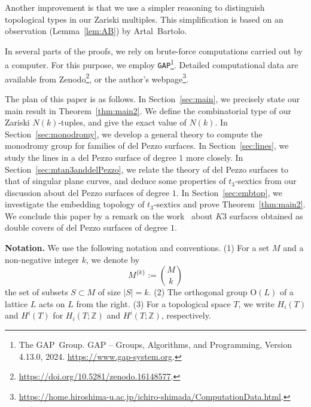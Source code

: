 \documentclass{math}
\theoremstyle{plain}
\numberwithin{equation}{section}
\newcommand{\ZZ}{\mathord{\mathbb Z}}
\newcommand{\OG}{\mathord{\mathrm{O}}}
\newcommand{\spset}[1]{^{\{#1\}}}
\newcommand{\mtan}[1]{t_{#1}}
\begin{document}
Another improvement is that 
we use a simpler reasoning to distinguish topological types in our Zariski multiples.
This simplification is based on an observation (Lemma~\ref{lem:AB})  by Artal~Bartolo.
\par
%
In several parts of the proofs, we rely on brute-force computations carried out by a computer. 
For this purpose, we employ \texttt{GAP}\footnote{The GAP~Group.
{GAP} -- {G}roups, {A}lgorithms, and {P}rogramming, Version  4.13.0, 2024.
\url{https://www.gap-system.org}.}. %
Detailed computational data are available from Zenodo\footnote{\url{https://doi.org/10.5281/zenodo.16148577}.},
or the author's webpage\footnote{\url{https://home.hiroshima-u.ac.jp/ichiro-shimada/ComputationData.html}.}.
%
\par
The plan of this paper is as follows.
In Section~\ref{sec:main}, we precisely state our main result in Theorem~\ref{thm:main2}.
We define the combinatorial type %
of our  Zariski $N(k)$-tuples, 
and give the exact value of $N(k)$.
In Section~\ref{sec:monodromy}, 
we develop a general theory to compute the monodromy group
for families of del Pezzo surfaces. 
In Section~\ref{sec:lines}, 
we study the lines in a del Pezzo surface of degree $1$
more closely.
In Section~\ref{sec:mtan3anddelPezzo}, 
we relate the theory of del Pezzo surfaces to that of singular plane curves,
and deduce some properties of $\mtan{3}$-sextics
from our discussion about  del Pezzo surfaces of degree $1$.
In Section~\ref{sec:embtop}, 
we investigate the embedding topology of $\mtan{3}$-sextics and 
prove Theorem~\ref{thm:main2}.
We conclude this paper by a remark on the work~\cite{Roulleau2022} about $K3$ surfaces obtained as 
double covers of  del Pezzo surfaces of degree $1$.
%
%
\par
\medskip
{\bf Notation.}
We use the following notation and conventions.
%
(1) 
For a set $M$ and a non-negative integer $k$,
we denote  by 
\[
M\spset{k}:=\displaystyle{\binom{M}{k}}
\]
 the set of subsets $S\subset M$ of size $|S|=k$.
%
%
(2) The orthogonal group $\OG(L)$ of a lattice $L$ acts on $L$ from the right.
(3) For a topological space $T$, 
we write $H_i(T)$ and $H^i(T)$ for $H_i(T;\ZZ)$ and $H^i(T;\ZZ)$, respectively.
%
%
%
%
\end{document}
